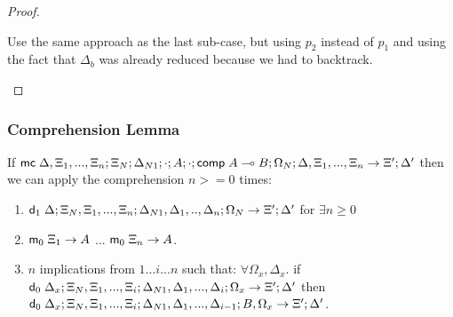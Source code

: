 \begin{proof}
\begin{itemize}
\begin{enumerate}
         Use the same approach as the last sub-case, but using $p_2$ instead of $p_1$ and using the fact that $\Delta_b$ was already reduced because we had to backtrack.
      \end{enumerate}
   \end{itemize}
   
   
\end{proof}

\subsubsection{Comprehension Lemma}

If $\mathsf{mc} \; \Delta, \Xi_1, ..., \Xi_n; \Xi_N; \Delta_{N1}; \cdot; A; \cdot; \mathsf{comp} \; A \multimap B; \Omega_N; \Delta, \Xi_1, ..., \Xi_n \rightarrow \Xi'; \Delta'$ then we can apply the comprehension $n >= 0$ times:
\begin{enumerate}
   \item $\mathsf{d}_1 \; \Delta; \Xi_N, \Xi_1, ..., \Xi_n; \Delta_{N1}, \Delta_1, .., \Delta_n; \Omega_N \rightarrow \Xi'; \Delta'$ for $\exists n \geq 0$
   \item $\mathsf{m}_0 \; \Xi_1 \rightarrow A$ ... $\mathsf{m}_0 \; \Xi_n \rightarrow A$.
   \item $n$ implications from $1 ... i ... n$ such that: $\forall \Omega_x, \Delta_x.$ if $\mathsf{d}_0 \; \Delta_x; \Xi_N, \Xi_1, ..., \Xi_i; \Delta_{N1}, \Delta_1, ..., \Delta_i; \Omega_x \rightarrow \Xi'; \Delta'$ then $\mathsf{d}_0 \; \Delta_x; \Xi_N, \Xi_1, ..., \Xi_i; \Delta_{N1}, \Delta_1, ..., \Delta_{i-1}; B, \Omega_x \rightarrow \Xi'; \Delta'$.
\end{enumerate}

